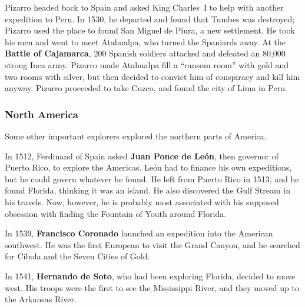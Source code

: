 Pizarro headed back to Spain and asked King Charles~I to help with another expedition to Peru.
In 1530, he departed and found that Tumbes was destroyed;
Pizarro used the place to found San Miguel de Piura, a new settlement.
He took his men and went to meet Atahualpa, who turned the Spaniards away.
At the \textbf{Battle of Cajamarca}, 200 Spanish soldiers attacked and defeated an 80,000 strong Inca army.
Pizarro made Atahualpa fill a ``ransom room'' with gold and two rooms with silver,
but then decided to convict him of conspiracy and kill him anyway.
Pizarro proceeded to take Cuzco, and found the city of Lima in Peru.

\subsubsection*{North America}

Some other important explorers explored the northern parts of America.

In 1512, Ferdinand of Spain asked \textbf{Juan Ponce de Le\'on},
then governor of Puerto Rico, to explore the Americas.
Le\'on had to finance his own expeditions, but he could govern whatever he found.
He left from Puerto Rico in 1513, and he found Florida, thinking it was an island.
He also discovered the Gulf Stream in his travels.
Now, however, he is probably most associated with his supposed obsession
with finding the Fountain of Youth around Florida.

In 1539, \textbf{Francisco Coronado} launched an expedition into the American southwest.
He was the first European to visit the Grand Canyon,
and he searched for Cibola and the Seven Cities of Gold.

In 1541, \textbf{Hernando de Soto}, who had been exploring Florida, decided to move west.
His troops were the first to see the Mississippi River, and they moved up to the Arkansas River.
